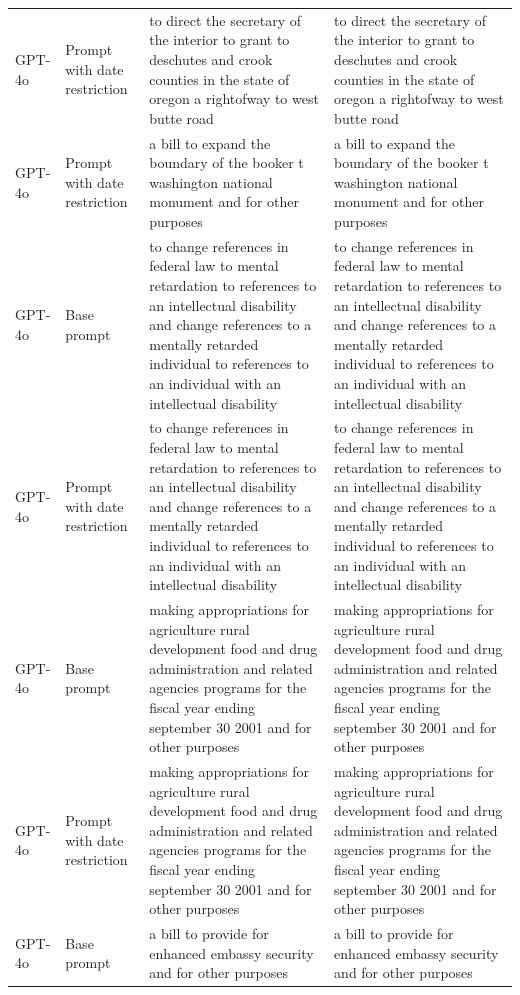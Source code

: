 \begin{longtable}{>{\raggedright\arraybackslash}p{1.4cm}>{\raggedright\arraybackslash}p{1.4cm}>{\raggedright\arraybackslash}p{5.5cm}>{\raggedright\arraybackslash}p{5.5cm}}
GPT-4o & Prompt with date restriction & to direct the secretary of the interior to grant to deschutes and crook counties in the state of oregon a rightofway to west butte road & to direct the secretary of the interior to grant to deschutes and crook counties in the state of oregon a rightofway to west butte road\\
GPT-4o & Prompt with date restriction & a bill to expand the boundary of the booker t washington national monument and for other purposes & a bill to expand the boundary of the booker t washington national monument and for other purposes\\
GPT-4o & Base prompt & to change references in federal law to mental retardation to references to an intellectual disability and change references to a mentally retarded individual to references to an individual with an intellectual disability & to change references in federal law to mental retardation to references to an intellectual disability and change references to a mentally retarded individual to references to an individual with an intellectual disability\\
GPT-4o & Prompt with date restriction & to change references in federal law to mental retardation to references to an intellectual disability and change references to a mentally retarded individual to references to an individual with an intellectual disability & to change references in federal law to mental retardation to references to an intellectual disability and change references to a mentally retarded individual to references to an individual with an intellectual disability\\
GPT-4o & Base prompt & making appropriations for agriculture rural development food and drug administration and related agencies programs for the fiscal year ending september 30 2001 and for other purposes & making appropriations for agriculture rural development food and drug administration and related agencies programs for the fiscal year ending september 30 2001 and for other purposes\\
GPT-4o & Prompt with date restriction & making appropriations for agriculture rural development food and drug administration and related agencies programs for the fiscal year ending september 30 2001 and for other purposes & making appropriations for agriculture rural development food and drug administration and related agencies programs for the fiscal year ending september 30 2001 and for other purposes\\
GPT-4o & Base prompt & a bill to provide for enhanced embassy security and for other purposes & a bill to provide for enhanced embassy security and for other purposes\\

\end{longtable}
